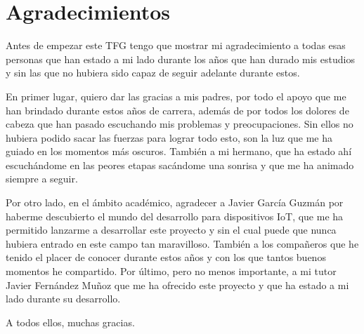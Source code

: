 \newpage %
\thispagestyle{empty}
\mbox{}

\chapter*{Agradecimientos}
\setcounter{page}{7}
Antes de empezar este TFG tengo que mostrar mi agradecimiento a todas esas personas que han estado a mi lado durante los años que han durado mis estudios y sin las que no hubiera sido capaz de seguir adelante durante estos.

En primer lugar, quiero dar las gracias a mis padres, por todo el apoyo que me han brindado durante estos años de carrera, además de por todos los dolores de cabeza que han pasado escuchando mis problemas y preocupaciones. Sin ellos no hubiera podido sacar las fuerzas para lograr todo esto, son la luz que me ha guiado en los momentos más oscuros. También a mi hermano, que ha estado ahí escuchándome en las peores etapas sacándome una sonrisa y que me ha animado siempre a seguir.

Por otro lado, en el ámbito académico, agradecer a Javier García Guzmán por haberme descubierto el mundo del desarrollo para dispositivos IoT, que me ha permitido lanzarme a desarrollar este proyecto y sin el cual puede que nunca hubiera entrado en este campo tan maravilloso. También a los compañeros que he tenido el placer de conocer durante estos años y con los que tantos buenos momentos he compartido. Por último, pero no menos importante, a mi tutor Javier Fernández Muñoz que me ha ofrecido este proyecto y que ha estado a mi lado durante su desarrollo.

A todos ellos, muchas gracias.